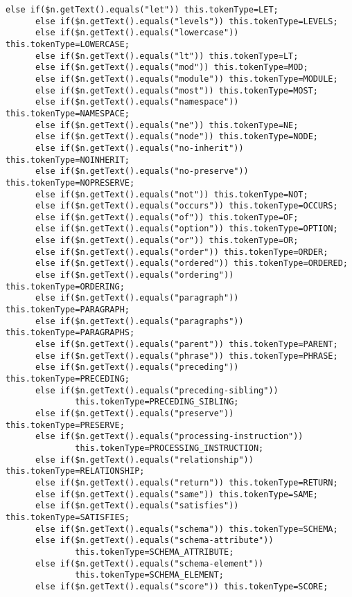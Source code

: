 \begin{Verbatim}[frame=none, fontsize=\footnotesize]
      else if($n.getText().equals("let")) this.tokenType=LET;
      else if($n.getText().equals("levels")) this.tokenType=LEVELS;
      else if($n.getText().equals("lowercase")) this.tokenType=LOWERCASE;
      else if($n.getText().equals("lt")) this.tokenType=LT;
      else if($n.getText().equals("mod")) this.tokenType=MOD;
      else if($n.getText().equals("module")) this.tokenType=MODULE;
      else if($n.getText().equals("most")) this.tokenType=MOST;
      else if($n.getText().equals("namespace")) this.tokenType=NAMESPACE;
      else if($n.getText().equals("ne")) this.tokenType=NE;
      else if($n.getText().equals("node")) this.tokenType=NODE;
      else if($n.getText().equals("no-inherit")) this.tokenType=NOINHERIT;
      else if($n.getText().equals("no-preserve")) this.tokenType=NOPRESERVE;
      else if($n.getText().equals("not")) this.tokenType=NOT;
      else if($n.getText().equals("occurs")) this.tokenType=OCCURS;
      else if($n.getText().equals("of")) this.tokenType=OF;
      else if($n.getText().equals("option")) this.tokenType=OPTION;
      else if($n.getText().equals("or")) this.tokenType=OR;
      else if($n.getText().equals("order")) this.tokenType=ORDER;
      else if($n.getText().equals("ordered")) this.tokenType=ORDERED;
      else if($n.getText().equals("ordering")) this.tokenType=ORDERING;
      else if($n.getText().equals("paragraph")) this.tokenType=PARAGRAPH;
      else if($n.getText().equals("paragraphs")) this.tokenType=PARAGRAPHS;
      else if($n.getText().equals("parent")) this.tokenType=PARENT;
      else if($n.getText().equals("phrase")) this.tokenType=PHRASE;
      else if($n.getText().equals("preceding")) this.tokenType=PRECEDING;
      else if($n.getText().equals("preceding-sibling")) 
              this.tokenType=PRECEDING_SIBLING;
      else if($n.getText().equals("preserve")) this.tokenType=PRESERVE;
      else if($n.getText().equals("processing-instruction")) 
              this.tokenType=PROCESSING_INSTRUCTION;
      else if($n.getText().equals("relationship")) this.tokenType=RELATIONSHIP;
      else if($n.getText().equals("return")) this.tokenType=RETURN;
      else if($n.getText().equals("same")) this.tokenType=SAME;
      else if($n.getText().equals("satisfies")) this.tokenType=SATISFIES;
      else if($n.getText().equals("schema")) this.tokenType=SCHEMA;
      else if($n.getText().equals("schema-attribute")) 
              this.tokenType=SCHEMA_ATTRIBUTE;
      else if($n.getText().equals("schema-element")) 
              this.tokenType=SCHEMA_ELEMENT;
      else if($n.getText().equals("score")) this.tokenType=SCORE;

\end{Verbatim}
